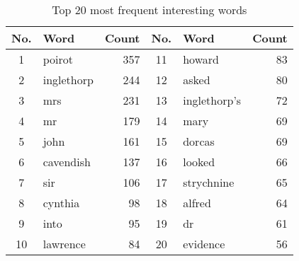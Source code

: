 \documentclass[12pt]{article}
\begin{document}
\begin{enumerate}
\begin{table}[h]
\begin{tabular}{c|l|r||c|l|r}
            \toprule
            No. & Word & Count & No. & Word & Count \\
            \midrule
            1 & poirot & 357 & 11 & howard & 83 \\
            2 & inglethorp & 244 & 12 & asked & 80 \\
            3 & mrs & 231 & 13 & inglethorp's & 72 \\
            4 & mr & 179 & 14 & mary & 69 \\
            5 & john & 161 & 15 & dorcas & 69 \\
            6 & cavendish & 137 & 16 & looked & 66 \\
            7 & sir & 106 & 17 & strychnine & 65 \\
            8 & cynthia & 98 & 18 & alfred & 64 \\
            9 & into & 95 & 19 & dr & 61 \\
            10 & lawrence & 84 & 20 & evidence & 56 \\
            \bottomrule
          \end{tabular}
          \caption{Top 20 most frequent interesting words}
          \label{top20int}
        \end{table}
\end{enumerate}
\end{document}
